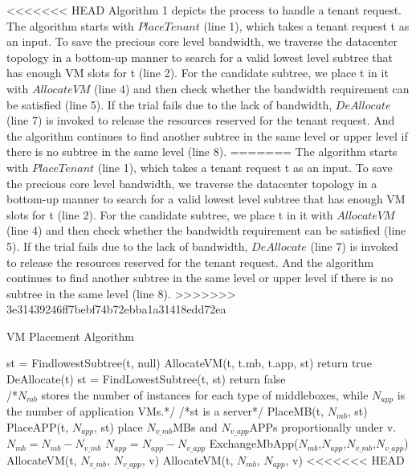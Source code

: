 \documentclass[review]{elsarticle}
\begin{document}
<<<<<<< HEAD
Algorithm 1 depicts the process to handle a tenant request. The algorithm starts with $PlaceTenant$ (line 1), which takes a tenant request t as an input. To save the precious core level bandwidth, we traverse the datacenter topology in a bottom-up manner to search for a valid lowest level subtree that has enough VM slots for t (line 2). For the candidate subtree, we place t in it with $AllocateVM$ (line 4) and then check whether the bandwidth requirement can be satisfied (line 5). If the trial fails due to the lack of bandwidth, $DeAllocate$ (line 7) is invoked to release the resources reserved for the tenant request. And the algorithm continues to find another subtree in the same level or upper level if there is no subtree in the same level (line 8). 
=======
The algorithm starts with $PlaceTenant$ (line 1), which takes a tenant request t as an input. To save the precious core level bandwidth, we traverse the datacenter topology in a bottom-up manner to search for a valid lowest level subtree that has enough VM slots for t (line 2). For the candidate subtree, we place t in it with $AllocateVM$ (line 4) and then check whether the bandwidth requirement can be satisfied (line 5). If the trial fails due to the lack of bandwidth, $DeAllocate$ (line 7) is invoked to release the resources reserved for the tenant request. And the algorithm continues to find another subtree in the same level or upper level if there is no subtree in the same level (line 8). 
>>>>>>> 3e31439246ff7bebf74b72ebba1a31418edd72ea
\begin{algorithm}[!htbp]
	\caption{VM Placement Algorithm}
	\label{alg1}
	\begin{algorithmic}[1]
		\State st = FindlowestSubtree(t, null)
		   \State AllocateVM(t, t.mb, t.app, st)
			   \State return true
		   \EndIf 
		   \State DeAllocate(t)
		   \State st = FindLowestSubtree(t, st)
		\EndWhile
		\State return false
	  \EndFunction
	  \\
	  /*$N_{mb}$ stores the number of instances for each type of middleboxes, while $N_{app}$ is the number of application VMs.*/
	   /*st is a server*/
		  \State PlaceMB(t, $N_{mb}$, st)
		  \State PlaceAPP(t, $N_{app}$, st)
	  \Else
				  \State place $N_{v\_mb}$MBs and $N_{v\_app}$APPs \State proportionally under v.
				  \State $N_{mb} = N_{mb} - N_{v\_mb}$
				  \State $N_{app} = N_{app} - N_{v\_app}$
				  \State ExchangeMbApp($N_{mb}$,$N_{app}$,$N_{v\_mb}$,$N_{v\_app}$)
				  \State AllocateVM(t, $N_{v\_mb}$, $N_{v\_app}$, v)
		      \Else
			      \State AllocateVM(t, $N_{mb}$, $N_{app}$, v)
			  \EndIf
		\EndIf
	  \EndFor
	\EndIf
   \EndFunction %
<<<<<<< HEAD
\end{algorithmic}
\end{algorithm}
\end{document}
